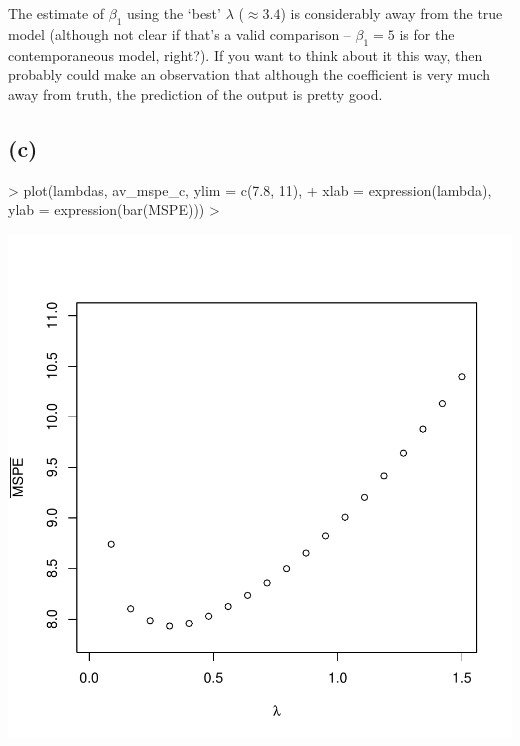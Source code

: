 \documentclass[a4paper,12pt,twoside]{article}
\begin{document}
The estimate of $\beta_1$ using the `best' $\lambda$ ($\approx 3.4$) is considerably away from the true model (although not clear if that's a valid comparison -- $\beta_1 = 5$ is for the contemporaneous model, right?). If you want to think about it this way, then probably could make an observation that although the coefficient is very much away from truth, the prediction of the output is pretty good.


\subsection*{(c)}

\begin{Schunk}
\begin{Sinput}
> plot(lambdas, av_mspe_c, ylim = c(7.8, 11),
+      xlab = expression(lambda), ylab = expression(bar(MSPE)))
> 
\end{Sinput}
\end{Schunk}
\includegraphics{ps2-007}
\end{document}
